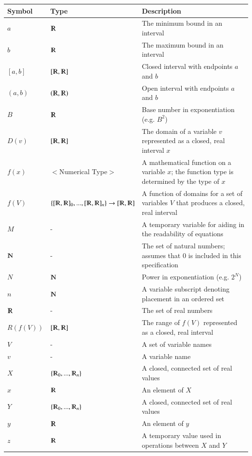 \documentclass[12pt]{article}
\begin{document}
\renewcommand{\arraystretch}{1.2}
\noindent \begin{longtable*}{m{1.5cm} m{5.3cm} m{8.2cm}} \toprule
\textbf{Symbol}  & \textbf{Type} & \textbf{Description}\\
\midrule 
\endhead
$a$ & $\varmathbb{R}$ & The minimum bound in an interval\\
$b$ & $\varmathbb{R}$ & The maximum bound in an interval\\
$[a,b]$ & $[\varmathbb{R}, \varmathbb{R}]$ & Closed interval with endpoints $a$ 
and $b$\\
$(a,b)$ & $(\varmathbb{R}, \varmathbb{R})$ & Open interval with endpoints $a$ 
and $b$\\
$B$ & $\varmathbb{R}$ & Base number in exponentiation (e.g. $B^2$)\\
$D(v)$ & $[\varmathbb{R}, \varmathbb{R}]$ & The domain of a variable $v$ 
represented as a closed, real interval $x$\\
$f(x)$ & $<$Numerical Type$>$ & A mathematical function on a variable $x$; the 
function type is determined by the type of $x$\\
$f(V)$ & $\{[\varmathbb{R}, \varmathbb{R}]_0, ..., [\varmathbb{R}, 
\varmathbb{R}]_n\} \rightarrow [\varmathbb{R}, 
\varmathbb{R}]$ & A function of domains for a set of variables $V$ that 
produces a closed, real interval\\
$M$ & - & A temporary variable for aiding in the readability of equations\\
$\varmathbb{N}$ & - & The set of natural numbers; assumes that $0$ is included 
in this specification\\
$N$ & $\varmathbb{N}$ & Power in exponentiation (e.g. $2^N$) \\
$n$ & $\varmathbb{N}$ & A variable subscript denoting placement in an ordered 
set\\
$\varmathbb{R}$ & - & The set of real numbers\\
$R(f(V))$ & $[\varmathbb{R}, \varmathbb{R}]$ & The range of $f(V)$ represented 
as a closed, real interval\\
$V$ & - & A set of variable names\\
$v$ & - & A variable name\\
$X$ & $\{\varmathbb{R}_0, ..., \varmathbb{R}_n\}$ & A closed, connected set of 
real values\\
$x$ & $\varmathbb{R}$ & An element of $X$\\
$Y$ & $\{\varmathbb{R}_0, ..., \varmathbb{R}_n\}$ & A closed, connected set of 
real values\\
$y$ & $\varmathbb{R}$ & An element of $y$\\
$z$ & $\varmathbb{R}$ & A temporary value used in operations between $X$ and 
$Y$\\
\bottomrule
\end{longtable*}
\end{document}
